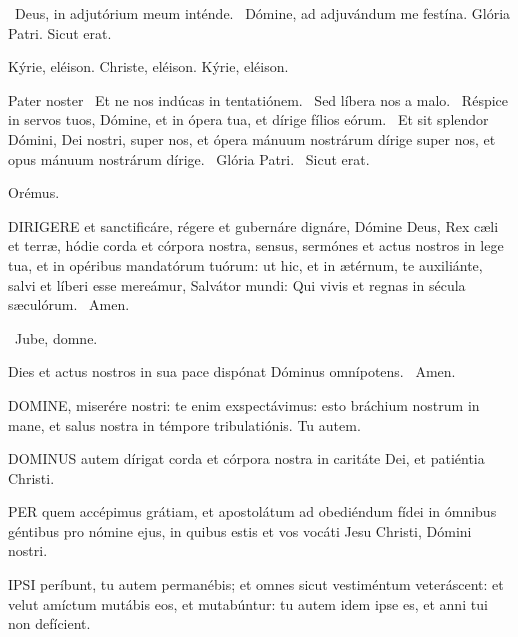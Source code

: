 \V\ Deus, in adjutórium meum inténde. \R\ Dómine, ad adjuvándum me festína.  Glória Patri. Sicut erat.

Kýrie, eléison. Christe, eléison. Kýrie, eléison.

Pater noster  \V\ Et ne nos indúcas in tentatiónem. \R\ Sed líbera nos a malo. \V\ Réspice in servos tuos, Dómine, et in ópera tua, et dírige fílios eórum. \R\ Et sit splendor Dómini, Dei nostri, super nos, et ópera mánuum nostrárum dírige super nos, et opus mánuum nostrárum dírige. \V\ Glória Patri. \R\ Sicut erat.

Orémus. 

\lettrine[lines=2]{D}{IRIGERE} et sanctificáre, régere et gubernáre dignáre, Dómine Deus, Rex cæli et terræ, hódie corda et córpora nostra, sensus, sermónes et actus nostros in lege tua, et in opéribus mandatórum tuórum: ut hic, et in ætérnum, te auxiliánte, salvi et líberi esse mereámur, Salvátor mundi: Qui vivis et regnas in sécula sæculórum. \R\ Amen.

\V\ Jube, domne.

 Dies et actus nostros in sua pace dispónat Dóminus omnípotens. \R\ Amen.

\sectionornament


\lettrine[lines=2]{D}{OMINE}, miserére nostri: te enim exspectávimus: esto bráchium nostrum in mane, et salus nostra in témpore tribulatiónis. Tu autem.



\lettrine[lines=2]{D}{OMINUS} autem dírigat corda et córpora nostra in caritáte Dei, et patiéntia Christi.

\sectionornament



\lettrine[lines=2]{P}{ER} quem accépimus grátiam, et apostolátum ad obediéndum fídei in ómnibus géntibus pro nómine ejus, in quibus estis et vos vocáti Jesu Christi, Dómini nostri.


\lettrine[lines=2]{I}{PSI} períbunt, tu autem permanébis; et omnes sicut vestiméntum veteráscent: et velut amíctum mutábis eos, et mutabúntur: tu autem idem ipse es, et anni tui non defícient.

